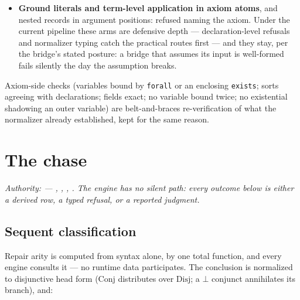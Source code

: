 \begin{itemize}
\begin{Verbatim}[fontsize=\small,frame=leftline,rulecolor=\color{accentmid},framesep=3mm,xleftmargin=3mm]
side-condition territory, not v1 bridge vocabulary
\end{Verbatim}
A model-of member, on today's routes, is caught upstream by the
element-valued-function refusal instead (its codomain is not
\texttt{Prop}); the bridge's own instance-valued arm — refusing
instance members as loader territory — stands behind it as
defensive depth, per the posture above. A \texttt{List} codomain is
caught upstream the same way; a \texttt{List} in a \emph{field}
position reaches the bridge's own list arm (verified:
\texttt{relation `P` field `x` uses a `List` type — list payloads
are side-condition territory (the \{len, at, concat\} roster), not
v1 bridge vocabulary}).
\item \textbf{Ground literals and term-level application in axiom
atoms}, and nested records in argument positions: refused naming the
axiom. Under the current pipeline these arms are defensive depth —
declaration-level refusals and normalizer typing catch the practical
routes first — and they stay, per the bridge's stated posture: a
bridge that assumes its input is well-formed fails silently the day
the assumption breaks.
\end{itemize}

\noindent Axiom-side checks (variables bound by \texttt{forall} or an
enclosing \texttt{exists}; sorts agreeing with declarations; fields
exact; no variable bound twice; no existential shadowing an outer
variable) are belt-and-braces re-verification of what the normalizer
already established, kept for the same reason.

\section{The chase}
\label{sec:gr-chase}

\emph{Authority:  — ,
, , . The engine
has no silent path: every outcome below is either a derived row, a
typed refusal, or a reported judgment.}

\subsection{Sequent classification}
\label{sec:gr-chase-classify}

Repair arity is computed from syntax alone, by one total function,
and every engine consults it — no runtime data participates. The
conclusion is normalized to disjunctive head form ($\mathrm{Conj}$
distributes over $\mathrm{Disj}$; a $\bot$ conjunct annihilates its
branch), and:

